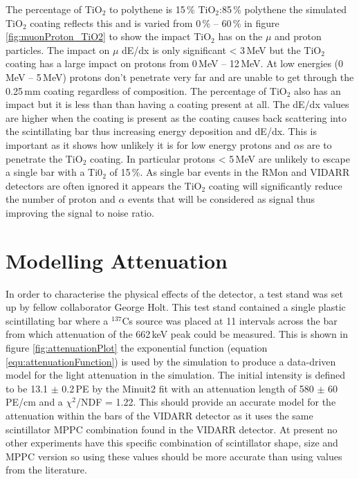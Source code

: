 
The percentage of TiO$_2$ to polythene is 15\,\% TiO$_2$:85\,\% polythene \cite{aliaga2014design} \cite{Pla-Dalmau2014} the simulated TiO$_2$ coating reflects this and is varied from 0\,\% -- 60\,\% in figure \ref{fig:muonProton_TiO2} to show the impact TiO$_2$ has on the $\mu$ and proton particles. The impact on $\mu$ dE/dx is only significant < 3\,MeV but the TiO$_2$ coating has a large impact on protons from 0\,MeV -- 12\,MeV. At low energies (0\,MeV -- 5\,MeV) protons don't penetrate very far and are unable to get through the 0.25\,mm coating regardless of composition. The percentage of TiO$_2$ also has an impact but it is less than than having a coating present at all. The dE/dx values are higher when the coating is present as the coating causes back scattering into the scintillating bar thus increasing energy deposition and dE/dx. This is important as it shows how unlikely it is for low energy protons and $\alpha$s are to penetrate the TiO$_2$ coating. In particular protons < 5\,MeV are unlikely to escape a single bar with a Ti0$_2$ of 15\,\%. As single bar events in the RMon and VIDARR detectors are often ignored it appears the TiO$_2$ coating will significantly reduce the number of proton and $\alpha$ events that will be considered as signal thus improving the signal to noise ratio. 

\section{Modelling Attenuation}\label{sec:GEANT4Simulation_ModellingAttenuation}
In order to characterise the physical effects of the detector, a test stand was set up by fellow collaborator George Holt. This test stand contained a single plastic scintillating bar where a $^{137}$Cs source was placed at 11 intervals across the bar from which attenuation of the 662\,keV peak could be measured. This is shown in figure \ref{fig:attenuationPlot} the exponential function (equation \ref{equ:attenuationFunction}) is used by the simulation to produce a data-driven model for the light attenuation in the simulation. The initial intensity is defined to be 13.1 $\pm$ 0.2\,PE by the Minuit2 fit with an attenuation length of 580 $\pm$ 60\,PE/cm and a $\chi^2$/NDF = 1.22. This should provide an accurate model for the attenuation within the bars of the VIDARR detector as it uses the same scintillator MPPC combination found in the VIDARR detector. At present no other experiments have this specific combination of scintillator shape, size and MPPC version so using these values should be more accurate than using values from the literature. 

